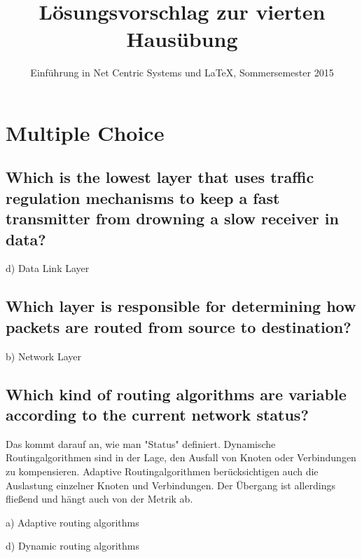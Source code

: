 \documentclass[a4paper,
			llpt,
			solution,
			accentcolor=tud2d,
			colorbacktitle
			]
			{tudexercise}
\title{Lösungsvorschlag zur vierten Hausübung}
\subtitle{Einführung in Net Centric Systems und \LaTeX, Sommersemester 2015}
\newcommand{\8}{$\infty$}
\begin{document}
\maketitle
\section{} \section{} \section{} \section{} \section{}
\section{Multiple Choice}
\subsection{Which is the lowest layer that uses traffic regulation mechanisms to keep a fast transmitter from drowning a slow receiver in data?}
\begin{compactenum}
\item[d)] Data Link Layer
\end{compactenum}
\subsection{Which layer is responsible for determining how packets are routed from source to destination?}
\begin{compactenum}
\item[b)] Network Layer
\end{compactenum}
\subsection{Which kind of routing algorithms are variable according to the current network status?}
Das kommt darauf an, wie man "Status" definiert. Dynamische Routingalgorithmen sind in der Lage, den Ausfall von Knoten oder Verbindungen zu kompensieren. Adaptive Routingalgorithmen berücksichtigen auch die Auslastung einzelner Knoten und Verbindungen. Der Übergang ist allerdings fließend und hängt auch von der Metrik ab.
\begin{compactenum}
\item[a)] Adaptive routing algorithms
\item[d)] Dynamic routing algorithms
\end{compactenum}
\end{document}
